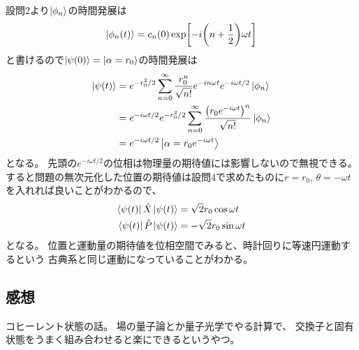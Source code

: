 \documentclass[../../master.tex]{subfiles}
\begin{document}
\subsection{}
設問2より\(\ket{\phi_n}\)の時間発展は
\begin{equation}\begin{aligned}[b]
    \ket{\phi_n(t)} = c_n(0)\exp[-i\qty(n+\frac{1}{2})\omega t]
\end{aligned}\end{equation}
と書けるので\(\ket{\psi(0)}=\ket{\alpha=r_0}\)の時間発展は
\begin{equation}\begin{aligned}[b]
    \ket{\psi(t)}
    &= e^{-r_0^2/2}\sum_{n=0}^{\infty}\frac{r_0^n}{\sqrt{n!}}e^{-in\omega t}e^{-i\omega t/2}\ket{\phi_n}\\
    &= e^{-i\omega t/2}e^{-r_0^2/2}\sum_{n=0}^{\infty}\frac{\qty(r_0e^{-i\omega t})^n}{\sqrt{n!}}\ket{\phi_n}\\
    &= e^{-i\omega t/2}\ket{\alpha=r_0e^{-i\omega t}}
\end{aligned}\end{equation}
となる。
先頭の\(e^{-i\omega t/2}\)の位相は物理量の期待値には影響しないので無視できる。
すると問題の無次元化した位置の期待値は設問4で求めたものに\(r=r_0,\,\theta = -\omega t\)を入れれば良いことがわかるので、
\begin{align}
    \bra{\psi(t)}\hat{X}\ket{\psi(t)} &= \sqrt{2}r_0\cos\omega t\\
    \bra{\psi(t)}\hat{P}\ket{\psi(t)} &= -\sqrt{2}r_0\sin\omega t
\end{align}
となる。
位置と運動量の期待値を位相空間でみると、時計回りに等速円運動するという
古典系と同じ運動になっていることがわかる。

\subsection*{感想}
コヒーレント状態の話。
場の量子論とか量子光学でやる計算で、
交換子と固有状態をうまく組み合わせると楽にできるというやつ。
\end{document}
